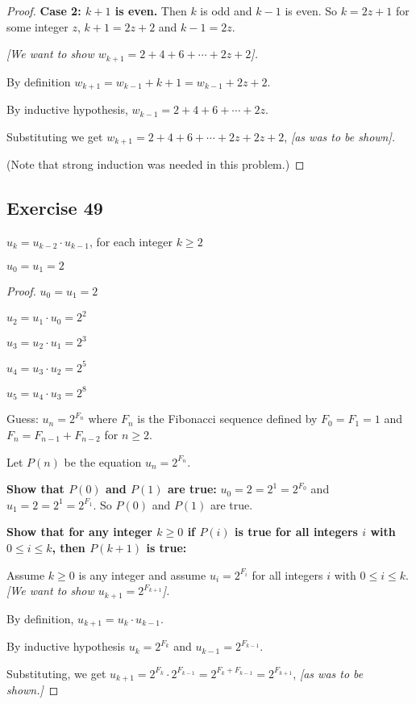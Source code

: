 \documentclass[14pt]{extarticle}
\begin{document}
\begin{proof}
        {\bf Case 2: $k+1$ is even.} Then $k$ is odd and $k-1$ is even.
    So $k = 2z+1$ for some integer $z$, $k+1 = 2z+2$ and $k-1 = 2z$.

        {\it [We want to show \(w_{k+1} = 2 + 4 + 6 + \cdots + 2z+2\)].}

    By definition \(w_{k+1} = w_{k-1} + k + 1 = w_{k-1} + 2z+2\).

    By inductive hypothesis, \(w_{k-1} = 2 + 4 + 6 + \cdots + 2z\).

    Substituting we get \(w_{k+1} = 2 + 4 + 6 + \cdots + 2z + 2z+2\), {\it [as was to be shown].}

    (Note that strong induction was needed in this problem.)
\end{proof}

\subsection{Exercise 49}
\(u_k = u_{k-2} \cdot u_{k-1}\), for each integer \(k \geq 2\)

\(u_0 = u_1 = 2\)

\begin{proof}
    \(u_0 = u_1 = 2\)

    \(u_2 = u_1 \cdot u_0 = 2^2\)

    \(u_3 = u_2 \cdot u_1 = 2^3\)

    \(u_4 = u_3 \cdot u_2 = 2^5\)

    \(u_5 = u_4 \cdot u_3 = 2^8\)

    Guess: \(u_n = 2^{F_n}\) where $F_n$ is the Fibonacci sequence defined by \(F_0 = F_1 = 1\) and
    \(F_n = F_{n-1} + F_{n-2}\) for \(n \geq 2\).

    Let $P(n)$ be the equation \(u_n = 2^{F_n}\).

        {\bf Show that $P(0)$ and $P(1)$ are true:} \(u_0 = 2 = 2^1 = 2^{F_0}\) and \(u_1 = 2 = 2^1 = 2^{F_1}\).
    So $P(0)$ and $P(1)$ are true.

        {\bf Show that for any integer \(k \geq 0\) if $P(i)$ is true for all integers $i$ with \(0 \leq i \leq k\), then
            $P(k+1)$ is true:}

    Assume \(k \geq 0\) is any integer and assume \(u_i = 2^{F_i}\) for all integers $i$ with \(0 \leq i \leq k\).
        {\it [We want to show \(u_{k+1} = 2^{F_{k+1}}\)].}

    By definition, \(u_{k+1} = u_k \cdot u_{k-1}\).

    By inductive hypothesis \(u_k = 2^{F_k}\) and \(u_{k-1} = 2^{F_{k-1}}\).

    Substituting, we get \(u_{k+1} = 2^{F_k} \cdot 2^{F_{k-1}} = 2^{F_k + F_{k-1}} = 2^{F_{k+1}}\),
    {\it [as was to be shown.]}
\end{proof}
\end{document}
